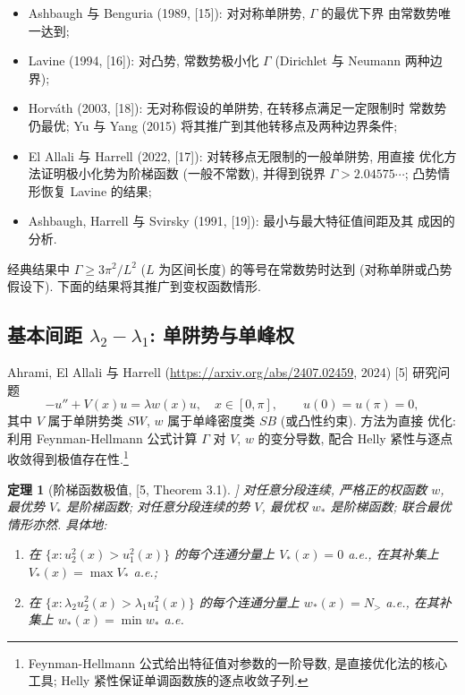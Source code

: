 \documentclass[UTF8]{ctexart}
\newtheorem{theorem}{定理}[section]
\begin{document}
\begin{itemize}
	\item Ashbaugh 与 Benguria (1989, [15]): 对对称单阱势, $\Gamma$ 的最优下界
		由常数势唯一达到;
	\item Lavine (1994, [16]): 对凸势, 常数势极小化 $\Gamma$ (Dirichlet 与
		Neumann 两种边界);
	\item Horv\'ath (2003, [18]): 无对称假设的单阱势, 在转移点满足一定限制时
		常数势仍最优; Yu 与 Yang (2015) 将其推广到其他转移点及两种边界条件;
	\item El Allali 与 Harrell (2022, [17]): 对转移点无限制的一般单阱势, 用直接
		优化方法证明极小化势为阶梯函数 (一般不常数), 并得到锐界
		$\Gamma > 2.04575\cdots$; 凸势情形恢复 Lavine 的结果;
	\item Ashbaugh, Harrell 与 Svirsky (1991, [19]): 最小与最大特征值间距及其
		成因的分析.
\end{itemize}

经典结果中 $\Gamma \geq 3\pi^2 / L^2$ ($L$ 为区间长度) 的等号在常数势时达到
(对称单阱或凸势假设下). 下面的结果将其推广到变权函数情形.

\subsection{\texorpdfstring{基本间距 $\lambda_2 - \lambda_1$: 单阱势与单峰权}{基本间距 lambda2 - lambda1: 单阱势与单峰权}}

Ahrami, El Allali 与 Harrell (\url{https://arxiv.org/abs/2407.02459}, 2024) [5] 研究问题
\begin{equation}
	-u'' + V(x)u = \lambda w(x)u, \quad x \in [0, \pi], \qquad u(0) = u(\pi) = 0,
\end{equation}
其中 $V$ 属于单阱势类 $SW$, $w$ 属于单峰密度类 $SB$ (或凸性约束). 方法为直接
优化: 利用 Feynman-Hellmann 公式计算 $\Gamma$ 对 $V$, $w$ 的变分导数, 配合
Helly 紧性与逐点收敛得到极值存在性.\footnote{Feynman-Hellmann 公式给出特征值对参数的一阶导数, 是直接优化法的核心工具; Helly 紧性保证单调函数族的逐点收敛子列.}

\begin{theorem}[阶梯函数极值, [5, Theorem 3.1]]
对任意分段连续, 严格正的权函数 $w$, 最优势 $V_*$ 是阶梯函数; 对任意分段连续的势
$V$, 最优权 $w_*$ 是阶梯函数; 联合最优情形亦然. 具体地:
\begin{enumerate}
	\item 在 $\{x : u_2^2(x) > u_1^2(x)\}$ 的每个连通分量上 $V_*(x) = 0$ a.e.,
		在其补集上 $V_*(x) = \max V_*$ a.e.;
	\item 在 $\{x : \lambda_2 u_2^2(x) > \lambda_1 u_1^2(x)\}$ 的每个连通分量上
		$w_*(x) = N_>$ a.e., 在其补集上 $w_*(x) = \min w_*$ a.e.
\end{enumerate}
\end{theorem}
\end{document}
